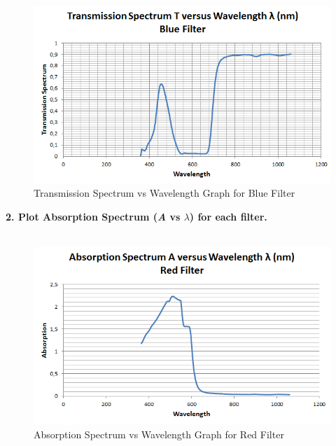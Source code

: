 \documentclass[a4paper,12pt]{report}
\begin{document}
\begin{figure}[h!]
\centering
\includegraphics[width=1.0\linewidth, height=0.4\textheight]{Blue}
\caption{Transmission Spectrum vs Wavelength Graph for Blue Filter}
\label{fig:Blue}
\end{figure}

\textbf{2. Plot Absorption Spectrum (\textit{A} vs $\lambda$) for each filter.}\\\\

\begin{figure}[h!]
\centering
\includegraphics[width=1.0\linewidth, height=0.4\textheight]{"Abs Red"}
\caption{Absorption Spectrum vs Wavelength Graph for Red Filter}
\label{fig:AbsRed}
\end{figure}
\end{document}
